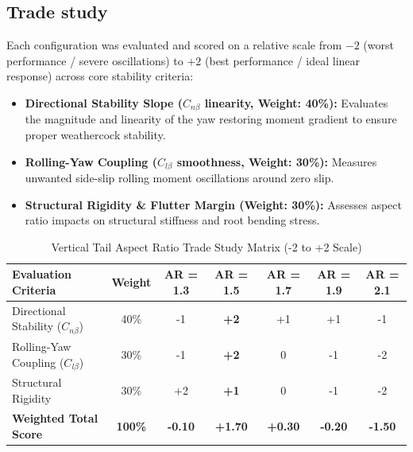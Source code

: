 \documentclass[11pt,a4paper]{article}
\begin{document}
\subsection{Trade study}

Each configuration was evaluated and scored on a relative scale from $-2$ (worst performance / severe oscillations) to $+2$ (best performance / ideal linear response) across core stability criteria:
\begin{itemize}
    \item \textbf{Directional Stability Slope ($C_{n\beta}$ linearity, Weight: 40\%):} Evaluates the magnitude and linearity of the yaw restoring moment gradient to ensure proper weathercock stability.
    \item \textbf{Rolling-Yaw Coupling ($C_{l\beta}$ smoothness, Weight: 30\%):} Measures unwanted side-slip rolling moment oscillations around zero slip.
    \item \textbf{Structural Rigidity \& Flutter Margin (Weight: 30\%):} Assesses aspect ratio impacts on structural stiffness and root bending stress.
\end{itemize}

\begin{table}[H]
\centering
\caption{Vertical Tail Aspect Ratio Trade Study Matrix (-2 to +2 Scale)}
\begin{tabular}{lcccccc}
\toprule
\textbf{Evaluation Criteria} & \textbf{Weight} & \textbf{AR = 1.3} & \textbf{AR = 1.5} & \textbf{AR = 1.7} & \textbf{AR = 1.9} & \textbf{AR = 2.1} \\
\midrule
Directional Stability ($C_{n\beta}$) & 40\% & -1 & \textbf{+2} & +1 & +1 & -1 \\
Rolling-Yaw Coupling ($C_{l\beta}$) & 30\% & -1 & \textbf{+2} & 0 & -1 & -2 \\
Structural Rigidity & 30\% & +2 & \textbf{+1} & 0 & -1 & -2 \\
\midrule
\textbf{Weighted Total Score} & \textbf{100\%} & \textbf{-0.10} & \textbf{+1.70} & \textbf{+0.30} & \textbf{-0.20} & \textbf{-1.50} \\
\bottomrule
\end{tabular}
\end{table}
\end{document}
